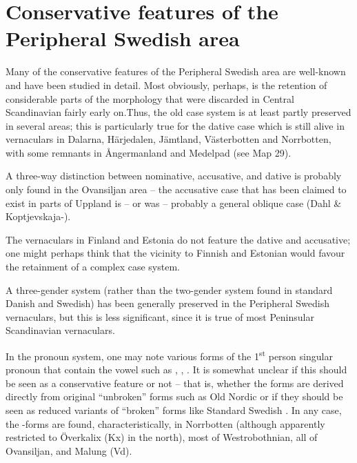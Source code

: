 \section{Conservative features of the Peripheral Swedish area}

Many of the conservative features of the Peripheral Swedish area are well-known and have been studied in detail. Most obviously, perhaps, is the retention of considerable parts of the morphology that were discarded in Central Scandinavian fairly early on.Thus, the old case system is at least partly preserved in several areas; this is particularly true for the dative case which is still alive in vernaculars in Dalarna, Härjedalen, Jämtland, Västerbotten and Norrbotten, with some remnants in Ångermanland and Medelpad (see Map 29). 



A three-way distinction between nominative, accusative, and dative is probably only found in the Ovansiljan area – the accusative case that has been claimed to exist in parts of Uppland is – or was – probably a general oblique case (Dahl \& Koptjevskaja-\citet{Tamm2006}). 




The vernaculars in Finland and Estonia do not feature the dative and accusative; one might perhaps think that the vicinity to Finnish and Estonian would favour the retainment of a complex case system. 




A three-gender system (rather than the two-gender system found in standard Danish and Swedish) has been generally preserved in the Peripheral Swedish vernaculars, but this is less significant, since it is true of most Peninsular Scandinavian vernaculars. 




In the pronoun system, one may note various forms of the 1\textsuperscript{st} person singular pronoun that contain the vowel such as , , . It is somewhat unclear if this should be seen as a conservative feature or not – that is, whether the forms are derived directly from original “unbroken” forms such as Old Nordic or if they should be seen as reduced variants of “broken” forms like Standard Swedish . In any case, the -forms are found, characteristically, in Norrbotten (although apparently restricted to Överkalix (Kx) in the north), most of Westrobothnian, all of Ovansiljan, and Malung (Vd). 





